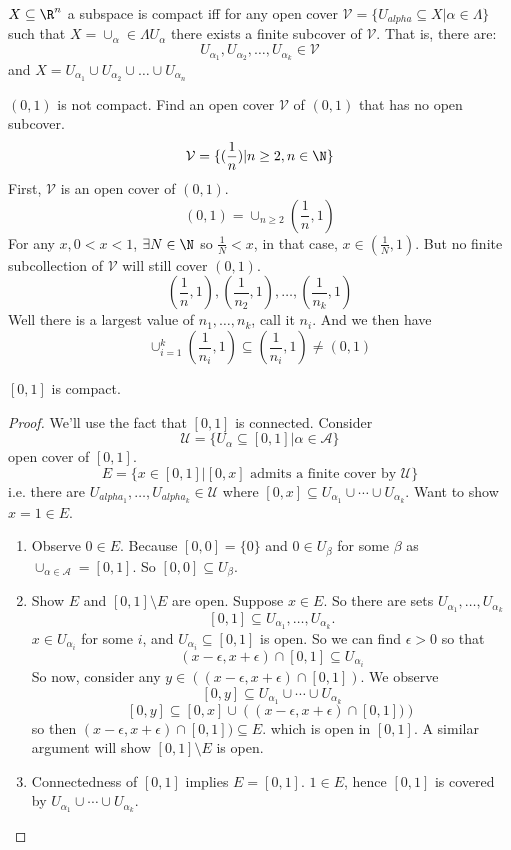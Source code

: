 \begin{definition}
  $X\subseteq \R^n$ a subspace is compact iff for any open cover $\mathcal{V}=\{U_{alpha}\subseteq X|\alpha \in \Lambda\}$ such that $X=\cup_\alpha \in \Lambda U_\alpha$ there exists a finite subcover of $\mathcal{V}$. That is, there are:
    $$U_{\alpha_1},U_{\alpha_2},\dots, U_{\alpha_k}\in \mathcal{V}$$
  and $X=U_{\alpha_1}\cup U_{\alpha_2} \cup \dots \cup U_{\alpha_n}$
\end{definition}

\begin{example}
  $(0,1)$ is not compact.
  \newline
  Find an open cover $\mathcal{V}$ of $(0,1)$ that has no open subcover.
    $$\mathcal{V}=\{ (\frac{1}{n}) | n\geq 2, n\in \N \}$$
First, $\mathcal{V}$ is an open cover of $(0,1)$.
  $$(0,1)=\cup_{n\geq 2}(\frac{1}{n},1)$$
For any $x, 0<x<1$, $\exists N\in \N$ so $\frac{1}{N}<x$, in that case, $x\in (\frac{1}{N},1)$. But no finite subcollection of $\mathcal{V}$ will still cover $(0,1)$.
  $$(\frac{1}{n},1),(\frac{1}{n_2},1), \dots ,(\frac{1}{n_k},1)$$
Well there is a largest value of $n_1,\dots , n_k$, call it $n_i$. And we then have
  $$\cup_{i=1}^k(\frac{1}{n_i},1)\subseteq (\frac{1}{n_i},1)\neq (0,1)$$
\end{example}

\begin{theorem}
  $[0,1]$ is compact.
\end{theorem}
\begin{proof}
  We'll use the fact that $[0,1]$ is connected. Consider
    $$\mathcal{U}=\{U_\alpha \subseteq [0,1] | \alpha \in \mathcal{A}\}$$
  open cover of $[0,1]$.
    $$E=\{x\in [0,1] | [0,x] \text{ admits a finite cover by }\mathcal{U} \}$$
  i.e. there are $U_{alpha_1},\dots , U_{alpha_k}\in \mathcal{U}$ where $[0,x]\subseteq U_{\alpha_1} \cup \cdots \cup U_{\alpha_k}$.
  Want to show $x=1\in E$.
  \begin{enumerate}[(1)]
    \item     Observe $0\in E$. Because $[0,0]=\{0\}$ and $0\in U_\beta$ for some $\beta$ as $\cup_{\alpha\in \mathcal{A}}=[0,1]$. So $[0,0]\subseteq U_\beta$.
    \item     Show $E$ and $[0,1]\setminus E$ are open. Suppose $x\in E$. So there are sets $U_{\alpha_1},\dots , U_{\alpha_k}$
      $$[0,1] \subseteq U_{\alpha_1},\dots , U_{\alpha_k}.$$
    $x\in U_{\alpha_i}$ for some $i$, and $U_{\alpha_i}\subseteq [0,1]$ is open. So we can find $\epsilon >0$ so that
      $$(x-\epsilon, x+\epsilon)\cap [0,1]\subseteq U_{\alpha_i}$$
    So now, consider any $y\in ((x-\epsilon, x+\epsilon)\cap [0,1])$. We observe
      $$[0,y]\subseteq U_{\alpha_1} \cup \cdots \cup U_{\alpha_k}$$
      $$[0,y]\subseteq [0,x]\cup \left((x-\epsilon, x+\epsilon)\cap [0,1])\right)$$
    so then $(x-\epsilon, x+\epsilon)\cap [0,1])\subseteq E$. which is open in $[0,1]$. A similar argument will show $[0,1]\setminus E$ is open.
    \item Connectedness of $[0,1]$ implies $E=[0,1]$. $1\in E$, hence $[0,1]$ is covered by $U_{\alpha_1} \cup \cdots \cup U_{\alpha_k}$.
  \end{enumerate}
\end{proof}

